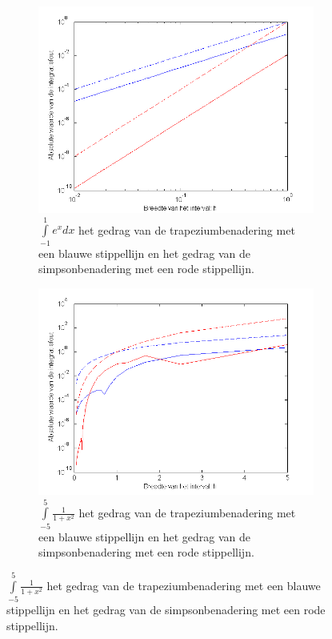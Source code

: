 \documentclass[11pt,a4paper]{article}
\begin{document}
\begin{figure}[H]

	\begin{subfigure}{0.5\textwidth}
	\includegraphics[width=\textwidth]{11b1.png}
	\caption*{$\int\limits_{-1}^1e^xdx$ het gedrag van de trapeziumbenadering met een blauwe stippellijn en het gedrag van de simpsonbenadering met een rode stippellijn.}
	\end{subfigure}
	\begin{subfigure}{0.5\textwidth}
	\includegraphics[width=\textwidth]{11b2.png}
	\caption*{$\int\limits_{-5}^5\frac{1}{1+x^2}$ het gedrag van de trapeziumbenadering met een blauwe stippellijn en het gedrag van de simpsonbenadering met een rode stippellijn.}
	\end{subfigure}

\end{figure}
\end{document}

